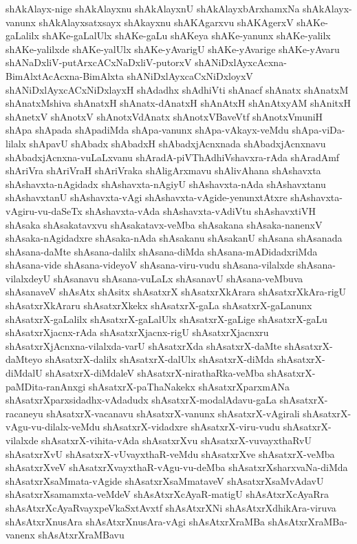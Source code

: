 {shAkAlayx-nige
shAkAlayxnu
shAkAlayxnU
shAkAlayxbArxhamxNa
shAkAlayx-vanunx
shAkAlayxsatxsayx
shAkayxnu
shAKAgarxvu
shAKAgerxV
shAKe-gaLalilx
shAKe-gaLalUlx
shAKe-gaLu
shAKeya
shAKe-yanunx
shAKe-yalilx
shAKe-yalilxde
shAKe-yalUlx
shAKe-yAvarigU
shAKe-yAvarige
shAKe-yAvaru
shANaDxliV-putArxcACxNaDxliV-putorxV
shANiDxlAyxcAcxna-BimAlxtAcAcxna-BimAlxta
shANiDxlAyxcaCxNiDxloyxV
shANiDxlAyxcACxNiDxlayxH
shAdadhx
shAdhiVti
shAnacf
shAnatx
shAnatxM
shAnatxMshiva
shAnatxH
shAnatx-dAnatxH
shAnAtxH
shAnAtxyAM
shAnitxH
shAnetxV
shAnotxV
shAnotxVdAnatx
shAnotxVBaveVtf
shAnotxVmuniH
shApa
shApada
shApadiMda
shApa-vanunx
shApa-vAkayx-veMdu
shApa-viDa-lilalx
shApavU
shAbadx
shAbadxH
shAbadxjAcnxnada
shAbadxjAcnxnavu
shAbadxjAcnxna-vuLaLxvanu
shAradA-piVThAdhiVshavxra-rAda
shAradAmf
shAriVra
shAriVraH
shAriVraka
shAligArxmavu
shAlivAhana
shAshavxta
shAshavxta-nAgidadx
shAshavxta-nAgiyU
shAshavxta-nAda
shAshavxtanu
shAshavxtanU
shAshavxta-vAgi
shAshavxta-vAgide-yenunxtAtxre
shAshavxta-vAgiru-vu-daSeTx
shAshavxta-vAda
shAshavxta-vAdiVtu
shAshavxtiVH
shAsaka
shAsakatavxvu
shAsakatavx-veMba
shAsakana
shAsaka-nanenxV
shAsaka-nAgidadxre
shAsaka-nAda
shAsakanu
shAsakanU
shAsana
shAsanada
shAsana-daMte
shAsana-dalilx
shAsana-diMda
shAsana-mADidadxriMda
shAsana-vide
shAsana-videyoV
shAsana-viru-vudu
shAsana-vilalxde
shAsana-vilalxdeyU
shAsanavu
shAsana-vuLaLx
shAsanavU
shAsana-veMbuva
shAsanaveV
shAsAtx
shAsitx
shAsatxrX
shAsatxrXkArara
shAsatxrXkAra-rigU
shAsatxrXkAraru
shAsatxrXkekx
shAsatxrX-gaLa
shAsatxrX-gaLanunx
shAsatxrX-gaLalilx
shAsatxrX-gaLalUlx
shAsatxrX-gaLige
shAsatxrX-gaLu
shAsatxrXjacnx-rAda
shAsatxrXjacnx-rigU
shAsatxrXjacnxru
shAsatxrXjAcnxna-vilalxda-varU
shAsatxrXda
shAsatxrX-daMte
shAsatxrX-daMteyo
shAsatxrX-dalilx
shAsatxrX-dalUlx
shAsatxrX-diMda
shAsatxrX-diMdalU
shAsatxrX-diMdaleV
shAsatxrX-nirathaRka-veMba
shAsatxrX-paMDita-ranAnxgi
shAsatxrX-paThaNakekx
shAsatxrXparxmANa
shAsatxrXparxsidadhx-vAdadudx
shAsatxrX-modalAdavu-gaLa
shAsatxrX-racaneyu
shAsatxrX-vacanavu
shAsatxrX-vanunx
shAsatxrX-vAgirali
shAsatxrX-vAgu-vu-dilalx-veMdu
shAsatxrX-vidadxre
shAsatxrX-viru-vudu
shAsatxrX-vilalxde
shAsatxrX-vihita-vAda
shAsatxrXvu
shAsatxrX-vuvayxthaRvU
shAsatxrXvU
shAsatxrX-vUvayxthaR-veMdu
shAsatxrXve
shAsatxrX-veMba
shAsatxrXveV
shAsatxrXvayxthaR-vAgu-vu-deMba
shAsatxrXsharxvaNa-diMda
shAsatxrXsaMmata-vAgide
shAsatxrXsaMmataveV
shAsatxrXsaMvAdavU
shAsatxrXsamamxta-veMdeV
shAsAtxrXcAyaR-matigU
shAsAtxrXcAyaRra
shAsAtxrXcAyaRvayxpeVkaSxtAvxtf
shAsAtxrXNi
shAsAtxrXdhikAra-viruva
shAsAtxrXnusAra
shAsAtxrXnusAra-vAgi
shAsAtxrXraMBa
shAsAtxrXraMBa-vanenx
shAsAtxrXraMBavu
}
